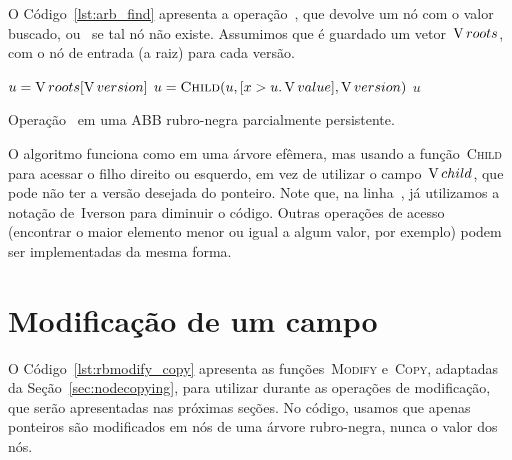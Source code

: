 \documentclass[main.tex]{subfiles}
\begin{document}
O Código~\ref{lst:arb_find} apresenta a operação~, que devolve um nó com o valor buscado, ou~ se tal nó não existe. Assumimos que é guardado um vetor~$\operatorname{V}{roots}$, com o nó de entrada (a raiz) para cada versão.

\begin{algorithm}
\begin{algorithmic}[1]

	\State $u = \operatorname{V}{roots}[\operatorname{V}{version}]$
	\State $u = \Call{Child}{u, [x > u.\val], \version}$ \label{line:findrb:iver}
	\EndWhile
	\State \Return $u$
\EndFunction

\end{algorithmic}
	\caption{Operação~ em uma ABB rubro-negra parcialmente persistente.} \label{lst:arb_find}
\end{algorithm}

O algoritmo funciona como em uma árvore efêmera, mas usando a função~\textsc{Child} para acessar o filho direito ou esquerdo, em vez de utilizar o campo~$\operatorname{V}{child}$, que pode não ter a versão desejada do ponteiro. Note que, na linha~, já utilizamos a notação de~Iverson para diminuir o código. Outras operações de acesso (encontrar o maior elemento menor ou igual a algum valor, por exemplo) podem ser implementadas da mesma forma.

\section{Modificação de um campo}

O Código~\ref{lst:rbmodify_copy} apresenta as funções~\textsc{Modify} e~\textsc{Copy}, adaptadas da Seção~\ref{sec:nodecopying}, para utilizar durante as operações de modificação, que serão apresentadas nas próximas seções. No código, usamos que apenas ponteiros são modificados em nós de uma árvore rubro-negra, nunca o valor dos nós.
\end{document}

